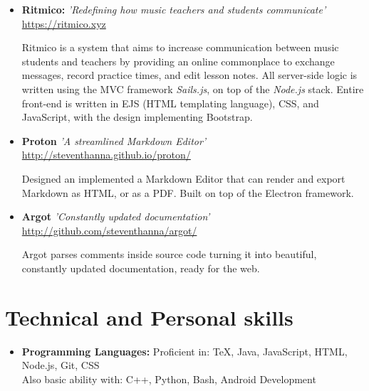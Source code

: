 \documentclass[11pt,a4paper,roman]{moderncv}        %
\begin{document}
\begin{itemize}

\item{\textbf{Ritmico:} \textit{'Redefining how music teachers and students communicate'} \url{https://ritmico.xyz}

\vspace{3pt}

\small{Ritmico is a system that aims to increase communication between music students and teachers by providing an online commonplace to exchange messages, record practice times, and edit lesson notes.  All server-side logic is written using the MVC framework \textit{Sails.js}, on top of the \textit{Node.js} stack.  Entire front-end is written in EJS (HTML templating language), CSS, and JavaScript, with the design implementing Bootstrap.}}

\vspace{6pt}

\item{\textbf{Proton} \textit{'A streamlined Markdown Editor'}  \url{http://steventhanna.github.io/proton/}

\vspace{3pt}

\small{Designed an implemented a Markdown Editor that can render and export Markdown as HTML, or as a PDF. Built on top of the Electron framework.}}

\vspace{6pt}

\item{\textbf{Argot} \textit{'Constantly updated documentation'}  \url{http://github.com/steventhanna/argot/}

\vspace{3pt}

\small{Argot parses comments inside source code turning it into beautiful, constantly updated documentation, ready for the web.}}

\vspace{6pt}

\end{itemize}

\section{Technical and Personal skills}

\vspace{6pt}

\begin{itemize}

\item \textbf{Programming Languages:} Proficient in: TeX, Java, JavaScript, HTML, Node.js, Git, CSS \\ Also basic ability with: C++, Python, Bash, Android Development

\vspace{6pt}

\end{itemize}
\end{document}
